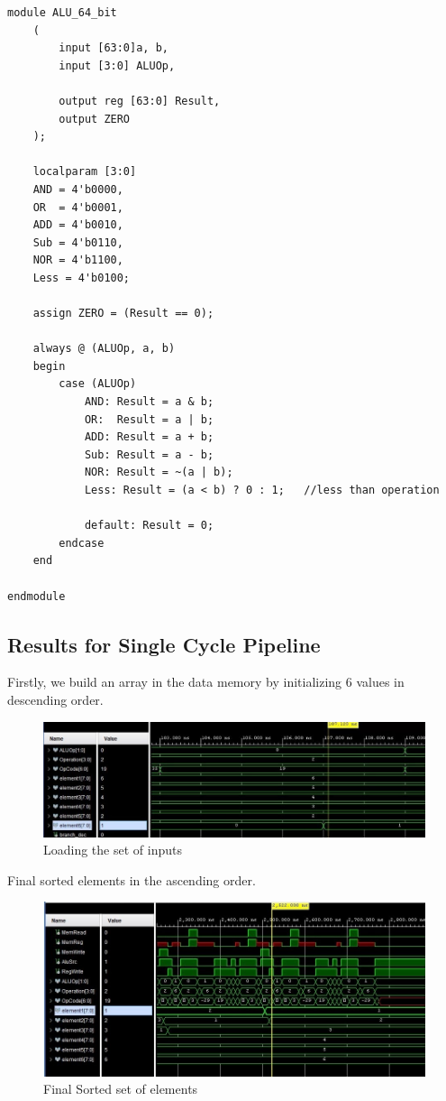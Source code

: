 \documentclass{article}
\begin{document}
\begin{lstlisting}[caption={Changes to ALU 64 bit}, captionpos=b, language=RISC-V]
module ALU_64_bit
    (
        input [63:0]a, b,
        input [3:0] ALUOp,
        
        output reg [63:0] Result,
        output ZERO
    );

    localparam [3:0]
    AND = 4'b0000,
    OR	= 4'b0001,
    ADD	= 4'b0010,
    Sub	= 4'b0110,
    NOR = 4'b1100,
    Less = 4'b0100;

    assign ZERO = (Result == 0);

    always @ (ALUOp, a, b)
    begin
        case (ALUOp)
            AND: Result = a & b;
            OR:	 Result = a | b;
            ADD: Result = a + b;
            Sub: Result = a - b;
            NOR: Result = ~(a | b);
            Less: Result = (a < b) ? 0 : 1;   //less than operation
            
            default: Result = 0;
        endcase
    end

endmodule
\end{lstlisting}


\subsection{Results for Single Cycle Pipeline}

Firstly, we build an array in the data memory by initializing 6 values in descending order. 


\begin{figure}[h]
    \centering
    \includegraphics*[width = 13 cm]{array_build.jpeg}
    \caption{Loading the set of inputs}
    \label{fig: label 1}
\end{figure}

Final sorted elements in the ascending order.

\begin{figure}[h]
    \centering
    \includegraphics*[width = 13 cm]{sorted_single.jpeg}
    \caption{Final Sorted set of elements}
    \label{fig: label 3}
\end{figure}
\end{document}
